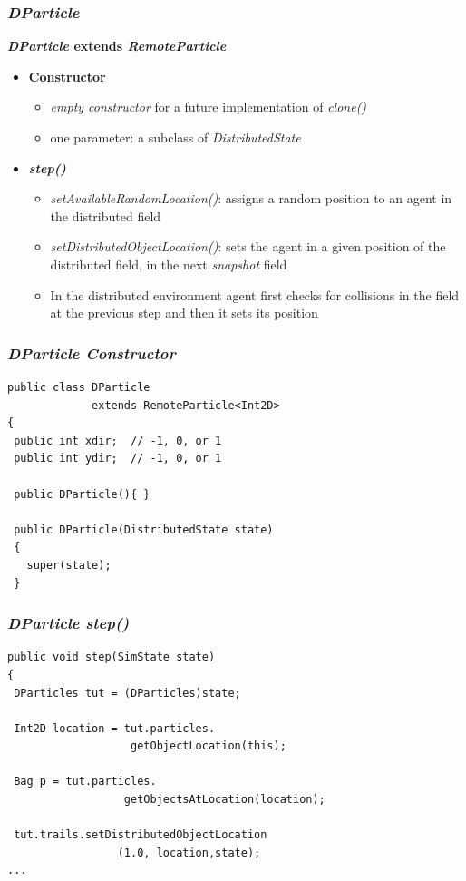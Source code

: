 \documentclass[]{beamer}
\begin{document}
\begin{frame}
\frametitle{\textit{DParticle}}
\textbf{\textit{DParticle} extends \textit{RemoteParticle}}
\begin{itemize}
	\item\textbf{Constructor}
	\begin{itemize}
		\item \textit{empty constructor} for a future implementation of \textit{clone()}
		\item one parameter: a subclass of \textit{DistributedState}
	\end{itemize}
	\item\textbf{\textit{step()}}
	\begin{itemize}
			\item \textit{setAvailableRandomLocation()}: assigns a random position to an agent in the distributed field
		\item \textit{setDistributedObjectLocation()}: sets the agent in a given position of the distributed field, in the next \textit{snapshot} field
		\item In the distributed environment agent first checks for collisions in the field at the previous step and then it sets its position
	\end{itemize}
\end{itemize}
\end{frame}

\begin{frame}[fragile]
\frametitle{\textit{DParticle Constructor}}
\begin{lstlisting}
public class DParticle 
             extends RemoteParticle<Int2D>
{
 public int xdir;  // -1, 0, or 1
 public int ydir;  // -1, 0, or 1
   
 public DParticle(){ }

 public DParticle(DistributedState state)
 {
   super(state);
 }
\end{lstlisting}
\end{frame}

\begin{frame}[fragile]
\frametitle{\textit{DParticle step()}}
\begin{lstlisting}
public void step(SimState state) 
{
 DParticles tut = (DParticles)state;
       
 Int2D location = tut.particles.
                   getObjectLocation(this);
        
 Bag p = tut.particles.
                  getObjectsAtLocation(location);
   
 tut.trails.setDistributedObjectLocation
                 (1.0, location,state);
...
\end{lstlisting}
\end{frame}
\end{document}
